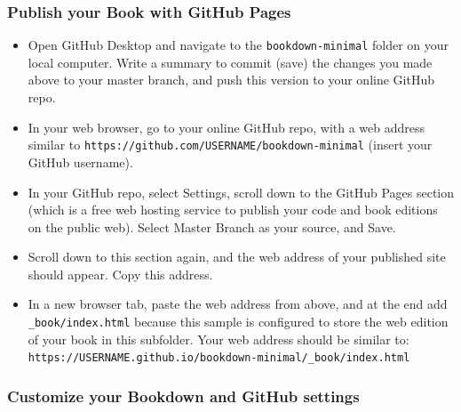 \documentclass[
  english,
]{book}
\providecommand{\tightlist}{%
  \setlength{\itemsep}{0pt}\setlength{\parskip}{0pt}}
\begin{document}
\hypertarget{publish-your-book-with-github-pages}{%
\subsubsection*{Publish your Book with GitHub Pages}\label{publish-your-book-with-github-pages}}

\begin{itemize}
\tightlist
\item
  Open GitHub Desktop and navigate to the \texttt{bookdown-minimal} folder on your local computer. Write a summary to commit (save) the changes you made above to your master branch, and push this version to your online GitHub repo.
\item
  In your web browser, go to your online GitHub repo, with a web address similar to \texttt{https://github.com/USERNAME/bookdown-minimal} (insert your GitHub username).
\item
  In your GitHub repo, select Settings, scroll down to the GitHub Pages section (which is a free web hosting service to publish your code and book editions on the public web). Select Master Branch as your source, and Save.
\item
  Scroll down to this section again, and the web address of your published site should appear. Copy this address.
\item
  In a new browser tab, paste the web address from above, and at the end add \texttt{\_book/index.html} because this sample is configured to store the web edition of your book in this subfolder. Your web address should be similar to: \texttt{https://USERNAME.github.io/bookdown-minimal/\_book/index.html}
\end{itemize}

\hypertarget{customize-your-bookdown-and-github-settings}{%
\subsubsection*{Customize your Bookdown and GitHub settings}\label{customize-your-bookdown-and-github-settings}}
\end{document}
